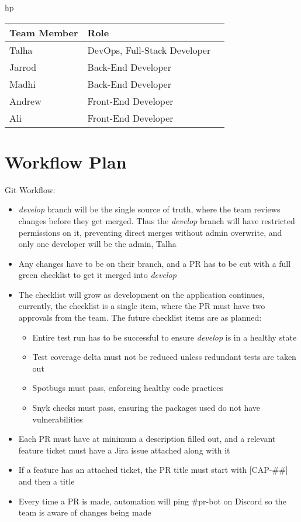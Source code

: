 \documentclass{article}
\begin{document}
\begin{tabular}{hp}
\caption{Team Developer Roles} \label{TblDevRoles}
\begin{tabularx}{\textwidth}{llX}
\toprule
\textbf{Team Member} & \textbf{Role}\\
\midrule
Talha & DevOps, Full-Stack Developer\\
Jarrod & Back-End Developer\\
Madhi & Back-End Developer\\
Andrew & Front-End Developer\\
Ali & Front-End Developer\\
\bottomrule
\end{tabularx}
\end{tabular}

\section{Workflow Plan}
Git Workflow: 
\begin{itemize}
	\item \emph{develop} branch will be the single source of truth, where the team reviews changes before they get merged. Thus the \emph{develop} branch will have restricted permissions on it, preventing direct merges without admin overwrite, and only one developer will be the admin, Talha
	\item Any changes have to be on their branch, and a PR has to be cut with a full green checklist to get it merged into \emph{develop}
	\item The checklist will grow as development on the application continues, currently, the checklist is a single item, where the PR must have two approvals from the team. The future checklist items are as planned:
	\begin{itemize}
		\item Entire test run has to be successful to ensure \emph{develop} is in a healthy state
		\item Test coverage delta must not be reduced unless redundant tests are taken out
		\item Spotbugs must pass, enforcing healthy code practices
		\item Snyk checks must pass, ensuring the packages used do not have vulnerabilities
	\end{itemize}
	\item Each PR must have at minimum a description filled out, and a relevant feature ticket must have a Jira issue attached along with it
	\item If a feature has an attached ticket, the PR title must start with [CAP-\#\#] and then a title
	\item Every time a PR is made, automation will ping \#{}pr-bot on Discord so the team is aware of changes being made
\end{itemize}
\end{document}
